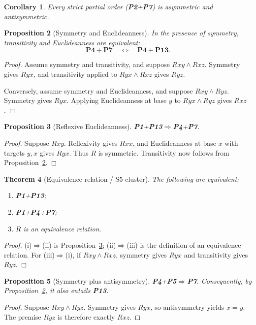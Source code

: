 \documentclass[11pt,a4paper,reqno]{amsart}
\newtheorem{proposition}{Proposition}[section]
\newtheorem{theorem}[proposition]{Theorem}
\newtheorem{corollary}[proposition]{Corollary}
\theoremstyle{definition}
\theoremstyle{remark}
\newcommand{\prop}[1]{\textbf{P#1}}
\newcommand{\catentails}{\Rightarrow}
\newcommand{\catequiv}{\Longleftrightarrow}
\begin{document}
\begin{corollary}
Every strict partial order (\prop{2}+\prop{7}) is asymmetric and
antisymmetric.
\end{corollary}

\begin{proposition}[Symmetry and Euclideanness]\label{prop:sym-eucl}
In the presence of symmetry, transitivity and Euclideanness are
equivalent:
\[
\prop{4}+\prop{7}\quad\catequiv\quad\prop{4}+\prop{13}.
\]
\end{proposition}
\begin{proof}
Assume symmetry and transitivity, and suppose $Rxy\wedge Rxz$.  Symmetry gives
$Ryx$, and transitivity applied to $Ryx\wedge Rxz$ gives $Ryz$.

Conversely, assume symmetry and Euclideanness, and suppose
$Rxy\wedge Ryz$.  Symmetry gives $Ryx$.  Applying Euclideanness at base
$y$ to $Ryx\wedge Ryz$ gives $Rxz$.
\end{proof}

\begin{proposition}[Reflexive Euclideanness]\label{prop:refl-eucl}
\prop{1}+\prop{13}$\catentails$\prop{4}+\prop{7}.
\end{proposition}
\begin{proof}
Suppose $Rxy$.  Reflexivity gives $Rxx$, and Euclideanness at base $x$
with targets $y,x$ gives $Ryx$.  Thus $R$ is symmetric.  Transitivity now
follows from Proposition~\ref{prop:sym-eucl}.
\end{proof}

\begin{theorem}[Equivalence relation / S5 cluster]\label{thm:s5}
The following are equivalent:
\begin{enumerate}[label=(\roman*),noitemsep]
\item \prop{1}+\prop{13};
\item \prop{1}+\prop{4}+\prop{7};
\item $R$ is an equivalence relation.
\end{enumerate}
\end{theorem}
\begin{proof}
(i)$\Rightarrow$(ii) is Proposition~\ref{prop:refl-eucl}; (ii)$\Rightarrow$(iii) is the
definition of an equivalence relation.  For (iii)$\Rightarrow$(i), if $Rxy\wedge Rxz$,
symmetry gives $Ryx$ and transitivity gives $Ryz$.
\end{proof}

\begin{proposition}[Symmetry plus antisymmetry]\label{prop:sym-antisym}
\prop{4}+\prop{5}$\catentails$\prop{7}.  Consequently, by
Proposition~\ref{prop:sym-eucl}, it also entails \prop{13}.
\end{proposition}
\begin{proof}
Suppose $Rxy\wedge Ryz$.  Symmetry gives $Ryx$, so antisymmetry yields $x=y$.
The premise $Ryz$ is therefore exactly $Rxz$.
\end{proof}
\end{document}
